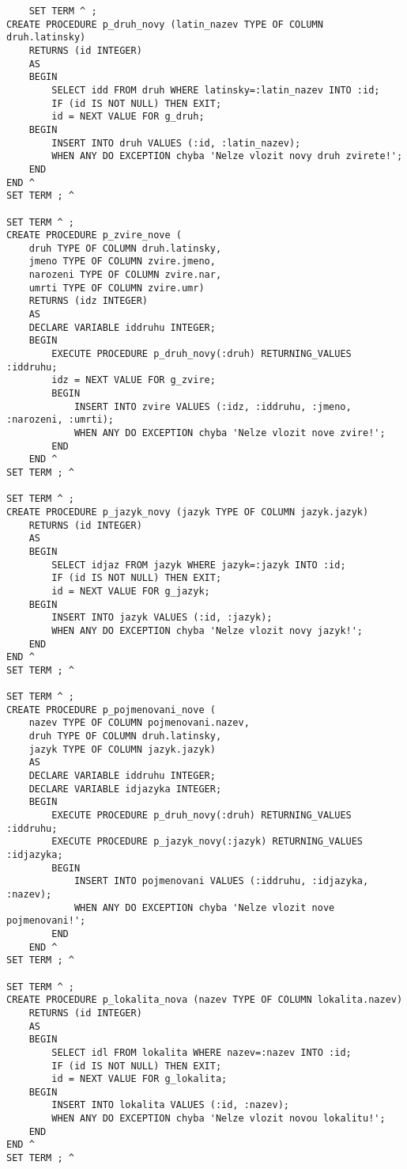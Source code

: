 \documentclass{article}
\begin{document}
\begin{lstlisting}
    SET TERM ^ ;
CREATE PROCEDURE p_druh_novy (latin_nazev TYPE OF COLUMN druh.latinsky)
    RETURNS (id INTEGER)
    AS
    BEGIN
        SELECT idd FROM druh WHERE latinsky=:latin_nazev INTO :id;
        IF (id IS NOT NULL) THEN EXIT; 
        id = NEXT VALUE FOR g_druh;
    BEGIN
        INSERT INTO druh VALUES (:id, :latin_nazev);
        WHEN ANY DO EXCEPTION chyba 'Nelze vlozit novy druh zvirete!';
    END
END ^ 
SET TERM ; ^ 

SET TERM ^ ;
CREATE PROCEDURE p_zvire_nove (
    druh TYPE OF COLUMN druh.latinsky, 
    jmeno TYPE OF COLUMN zvire.jmeno, 
    narozeni TYPE OF COLUMN zvire.nar, 
    umrti TYPE OF COLUMN zvire.umr)
    RETURNS (idz INTEGER)
    AS
    DECLARE VARIABLE iddruhu INTEGER;
    BEGIN
        EXECUTE PROCEDURE p_druh_novy(:druh) RETURNING_VALUES :iddruhu;
        idz = NEXT VALUE FOR g_zvire;
        BEGIN
            INSERT INTO zvire VALUES (:idz, :iddruhu, :jmeno, :narozeni, :umrti);
            WHEN ANY DO EXCEPTION chyba 'Nelze vlozit nove zvire!';
        END
    END ^
SET TERM ; ^

SET TERM ^ ;
CREATE PROCEDURE p_jazyk_novy (jazyk TYPE OF COLUMN jazyk.jazyk)
    RETURNS (id INTEGER)
    AS
    BEGIN
        SELECT idjaz FROM jazyk WHERE jazyk=:jazyk INTO :id;
        IF (id IS NOT NULL) THEN EXIT; 
        id = NEXT VALUE FOR g_jazyk;
    BEGIN
        INSERT INTO jazyk VALUES (:id, :jazyk);
        WHEN ANY DO EXCEPTION chyba 'Nelze vlozit novy jazyk!';
    END
END ^ 
SET TERM ; ^ 

SET TERM ^ ;
CREATE PROCEDURE p_pojmenovani_nove (
    nazev TYPE OF COLUMN pojmenovani.nazev, 
    druh TYPE OF COLUMN druh.latinsky, 
    jazyk TYPE OF COLUMN jazyk.jazyk)
    AS
    DECLARE VARIABLE iddruhu INTEGER;
    DECLARE VARIABLE idjazyka INTEGER;
    BEGIN
        EXECUTE PROCEDURE p_druh_novy(:druh) RETURNING_VALUES :iddruhu;
        EXECUTE PROCEDURE p_jazyk_novy(:jazyk) RETURNING_VALUES :idjazyka;
        BEGIN
            INSERT INTO pojmenovani VALUES (:iddruhu, :idjazyka, :nazev);
            WHEN ANY DO EXCEPTION chyba 'Nelze vlozit nove pojmenovani!';
        END
    END ^
SET TERM ; ^

SET TERM ^ ;
CREATE PROCEDURE p_lokalita_nova (nazev TYPE OF COLUMN lokalita.nazev)
    RETURNS (id INTEGER)
    AS
    BEGIN
        SELECT idl FROM lokalita WHERE nazev=:nazev INTO :id;
        IF (id IS NOT NULL) THEN EXIT; 
        id = NEXT VALUE FOR g_lokalita;
    BEGIN
        INSERT INTO lokalita VALUES (:id, :nazev);
        WHEN ANY DO EXCEPTION chyba 'Nelze vlozit novou lokalitu!';
    END
END ^ 
SET TERM ; ^ 
\end{lstlisting}
\end{document}
